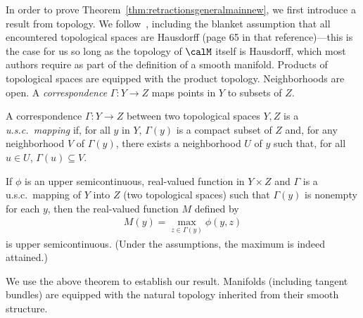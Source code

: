In order to prove Theorem~\ref{thm:retractionsgeneralmainnew}, we first introduce a result from topology. We follow~\cite{berge1963topological}, including the blanket assumption that all encountered topological spaces are Hausdorff (page 65 in that reference)---this is the case for us so long as the topology of $\calM$ itself is Hausdorff, which most authors require as part of the definition of a smooth manifold. Products of topological spaces are equipped with the product topology. Neighborhoods are open. A \emph{correspondence} $\Gamma \colon Y \to Z$ maps points in $Y$ to subsets of $Z$.
\begin{definition} \label{def:uscmapping}
	A correspondence $\Gamma \colon Y \rightarrow Z$ between two topological spaces $Y, Z$ is a \emph{u.s.c.\ mapping} if, for all $y$ in $Y$, $\Gamma(y)$ is a compact subset of $Z$ and, for any neighborhood $V$ of $\Gamma(y)$, there exists a neighborhood $U$ of $y$ such that, for all $u \in U$, $\Gamma(u) \subseteq V$. 
\end{definition}
\begin{theorem} \label{thm:bergemain}
	If $\phi$ is an upper semicontinuous, real-valued function in $Y \times Z$ and $\Gamma$ is a u.s.c.\ mapping of $Y$ into $Z$ (two topological spaces) such that $\Gamma(y)$ is nonempty for each $y$, then the real-valued function $M$ defined by
	\begin{align*}
	M(y) = \max_{z \in \Gamma(y)} \phi(y,z)
	\end{align*}
	is upper semicontinuous. (Under the assumptions, the maximum is indeed attained.)
\end{theorem}

We use the above theorem to establish our result. Manifolds (including tangent bundles) are equipped with the natural topology inherited from their smooth structure.

